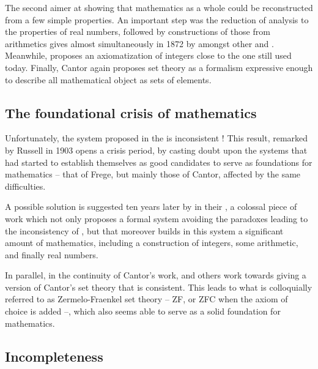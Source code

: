 The second aimer at showing that mathematics as a whole could be reconstructed from a
few simple properties. An important step was the reduction of analysis to the properties
of real numbers, followed by constructions of those from arithmetics gives almost
simultaneously in 1872 by amongst other  and
.
Meanwhile,  proposes an axiomatization of integers close to the
one still used today. Finally, Cantor again proposes set theory 
as a formalism expressive enough to describe all mathematical object as sets of elements.

\subsection{The foundational crisis of mathematics}

Unfortunately, the system proposed in the  is inconsistent%
 !
This result, remarked by Russell in 1903%
opens a crisis period, by casting doubt upon the systems that had started to establish
themselves as good candidates to serve as foundations for mathematics – that of Frege, but
mainly those of Cantor, affected by the same difficulties.

A possible solution is suggested ten years later  by \citeauthor{Whitehead1913} in their
 , a colossal piece of work
which not only proposes a formal system avoiding the paradoxes leading to the inconsistency
of , but that moreover builds in this system a significant amount
of mathematics, including a construction of integers, some arithmetic, and finally real
numbers.

In parallel, in the continuity of Cantor’s work,  and others
work towards giving a version of Cantor’s set theory that is consistent. This leads to what
is colloquially referred to as Zermelo-Fraenkel set theory – ZF, or ZFC when the
axiom of choice  is added –, which also seems able to serve as a
solid foundation for mathematics.

\subsection{Incompleteness}

